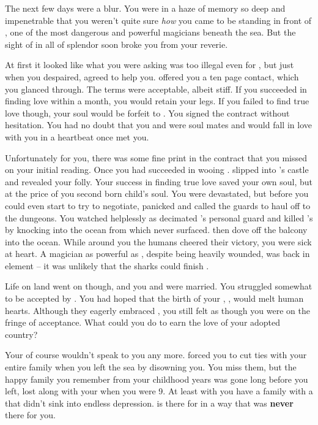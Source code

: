\documentclass[char]{NeptuneBall}
\begin{document}
The next few days were a blur. You were in a haze of memory so deep and impenetrable that you weren't quite sure \emph{how} you came to be standing in front of \cWitch{}, one of the most dangerous and powerful magicians beneath the sea. But the sight of \cWitch{\them} in all of \cWitch{\their} splendor soon broke you from your reverie.

At first it looked like what you were asking was too illegal even for \cWitch{}, but just when you despaired, \cWitch{\they} agreed to help you. \cWitch{} offered you a ten page contact, which you glanced through. The terms were acceptable, albeit stiff. If you succeeded in finding love within a month, you would retain your legs. If you failed to find true love though, your soul would be forfeit to \cWitch{}. You signed the contract without hesitation. You had no doubt that you and \cEric{} were soul mates and \cEric{\they} would fall in love with you in a heartbeat once \cEric{} met you.

Unfortunately for you, there was some fine print in the contract that you missed on your initial reading. Once you had succeeded in wooing \cEric{}. \cWitch{} slipped into \cEric{}'s castle and revealed your folly. Your success in finding true love saved your own soul, but at the price of you second born child's soul. You were devastated, but before you could even start to try to negotiate, \cEric{} panicked and called the guards to haul \cWitch{} off to the dungeons. You watched helplessly as \cWitch{} decimated \cEric{}'s personal guard and killed \cEric{}'s \cPrince{\sibling} \cSlave{} by knocking \cSlave{\them} into the ocean from which \cSlave{\they} never surfaced. \cWitch{} then dove off the balcony into the ocean. While around you the humans cheered their victory, you were sick at heart. A magician as powerful as \cWitch{}, despite being heavily wounded, was back in \cWitch{\their} element -- it was unlikely that the sharks could finish \cWitch{\them}.

Life on land went on though, and you and \cEric{} were married. You struggled somewhat to be accepted by \pAmerica{}. You had hoped that the birth of your \cWillow{\offspring}, \cWillow{}, would melt human hearts. Although they eagerly embraced \cWillow{}, you still felt as though you were on the fringe of acceptance. What could you do to earn the love of your adopted country? 

Your \cKing{\parent} of course wouldn't speak to you any more. \cKing{\They} forced you to cut ties with your entire family when you left the sea by disowning you. You miss them, but the happy family you remember from your childhood years was gone long before you left, lost along with your \cAthena{\parent} when you were 9. At least with \cEric{} you have a family with a \cEric{\parent} that didn't sink into endless depression. \cEric{} is there for \cWillow{} in a way that \cKing{} was {\bf never} there for you.
\end{document}
